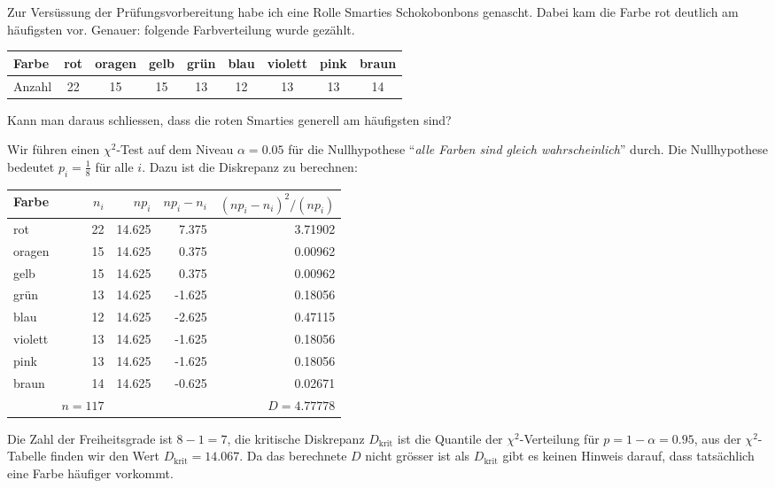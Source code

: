 Zur Versüssung der Prüfungsvorbereitung habe ich eine Rolle Smarties
Schokobonbons genascht. Dabei kam die Farbe rot deutlich am häufigsten vor.
Genauer: folgende Farbverteilung wurde gezählt. 
\begin{center}
\begin{tabular}{|l|cccccccc|}
\hline
Farbe&rot&oragen&gelb&grün&blau&violett&pink&braun\\
\hline
Anzahl&22&    15&  15&   13&  12&     13&  13&   14\\
\hline
\end{tabular}
\end{center}
Kann man daraus schliessen, dass die roten Smarties generell am häufigsten
sind?

\begin{loesung}
Wir führen einen $\chi^2$-Test auf dem Niveau $\alpha=0.05$
für die Nullhypothese 
``{\it alle Farben sind gleich wahrscheinlich}'' durch.
Die Nullhypothese bedeutet $p_i=\frac18$ für alle $i$.
Dazu ist die Diskrepanz zu berechnen:
\begin{center}
\begin{tabular}{|l|r|r|r|r|}
\hline
Farbe  &$n_i$   &$np_i$&$np_i-n_i$&$(np_i-n_i)^2/(np_i)$\\
\hline
rot    &   22   &14.625&     7.375&              3.71902\\
oragen &   15   &14.625&     0.375&              0.00962\\
gelb   &   15   &14.625&     0.375&              0.00962\\
grün  &   13   &14.625&    -1.625&              0.18056\\
blau   &   12   &14.625&    -2.625&              0.47115\\
violett&   13   &14.625&    -1.625&              0.18056\\
pink   &   13   &14.625&    -1.625&              0.18056\\
braun  &   14   &14.625&    -0.625&              0.02671\\
\hline
       &$n=117$ &      &          &$D= 4.77778         $\\
\hline
\end{tabular}
\end{center}
Die Zahl der Freiheitsgrade ist $8-1=7$, die kritische Diskrepanz
$D_{\text{krit}}$ ist die Quantile der $\chi^2$-Verteilung 
für $p=1-\alpha=0.95$, aus der $\chi^2$-Tabelle finden wir den
Wert $D_{\text{krit}}=14.067$. Da das berechnete $D$ nicht grösser
ist als $D_{\text{krit}}$ gibt es keinen Hinweis darauf, dass
tatsächlich eine Farbe häufiger vorkommt.
\end{loesung}
